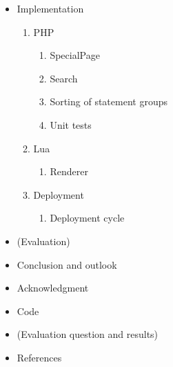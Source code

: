 \documentclass[11pt]{article}
\begin{document}
  \begin{itemize}
  \item Implementation
  \begin{enumerate}
   \item PHP
   \begin{enumerate}
    \item SpecialPage
    \item Search
    \item Sorting of statement groups
    \item Unit tests
   \end{enumerate}
   \item Lua
   \begin{enumerate}
    \item Renderer
   \end{enumerate}
   \item Deployment
   \begin{enumerate}
    \item Deployment cycle
   \end{enumerate}
  \end{enumerate}
  \item (Evaluation)
  \item Conclusion and outlook
  \item Acknowledgment
  \item Code
  \item (Evaluation question and results)
  \item References
\end{itemize}
\end{document}
